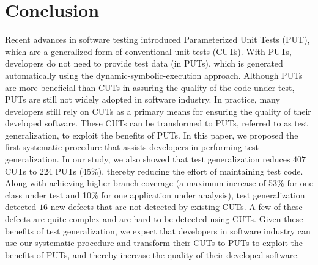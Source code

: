 \section{Conclusion}
\label{sec:conclusion}

Recent advances in software testing introduced Parameterized Unit Tests (PUT), which are a generalized form of conventional unit tests (CUTs). With PUTs, developers do not need to provide test data (in PUTs), which is generated automatically using the dynamic-symbolic-execution approach. Although PUTs are more beneficial than CUTs in assuring the quality of the code under test, PUTs are still not widely adopted in software industry. In practice, many developers still rely on CUTs as a primary means for ensuring the quality of their developed software. These CUTs can be transformed to PUTs, referred to as test generalization, to exploit the benefits of PUTs. In this paper, we proposed the first systematic procedure that assists developers in performing test generalization. In our study, we also showed that test generalization reduces $407$ CUTs to $224$ PUTs (45\%), thereby reducing the effort of maintaining test code. Along with achieving higher branch coverage (a maximum increase of 53\% for one class under test and 10\% for one application under analysis), test generalization detected $16$ new defects that are not detected by existing CUTs. A few of these defects are quite complex and are hard to be detected using CUTs. Given these benefits of test generalization, we expect that developers in software industry can use our systematic procedure and transform their CUTs to PUTs to exploit the benefits of PUTs, and thereby increase the quality of their developed software.

